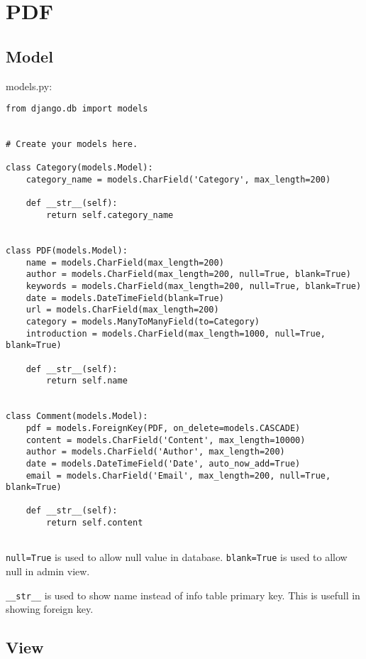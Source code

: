 
\chapter{PDF}

\section{Model}

models.py:
\lstset{language=Python}
\begin{lstlisting}
from django.db import models


# Create your models here.

class Category(models.Model):
    category_name = models.CharField('Category', max_length=200)

    def __str__(self):
        return self.category_name


class PDF(models.Model):
    name = models.CharField(max_length=200)
    author = models.CharField(max_length=200, null=True, blank=True)
    keywords = models.CharField(max_length=200, null=True, blank=True)
    date = models.DateTimeField(blank=True)
    url = models.CharField(max_length=200)
    category = models.ManyToManyField(to=Category)
    introduction = models.CharField(max_length=1000, null=True, blank=True)

    def __str__(self):
        return self.name


class Comment(models.Model):
    pdf = models.ForeignKey(PDF, on_delete=models.CASCADE)
    content = models.CharField('Content', max_length=10000)
    author = models.CharField('Author', max_length=200)
    date = models.DateTimeField('Date', auto_now_add=True)
    email = models.CharField('Email', max_length=200, null=True, blank=True)

    def __str__(self):
        return self.content
  
\end{lstlisting}

\verb|null=True| is used to allow null value in database.
\verb|blank=True| is used to allow null in admin view.

\verb|__str__| is used to show name instead of info table primary key.
This is usefull in showing foreign key.


\section{View}

